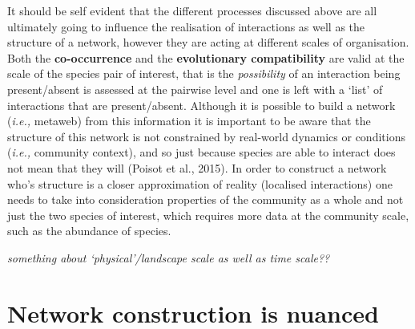 \documentclass[
]{article}
\begin{document}
It should be self evident that the different processes discussed above
are all ultimately going to influence the realisation of interactions as
well as the structure of a network, however they are acting at different
scales of organisation. Both the \textbf{co-occurrence} and the
\textbf{evolutionary compatibility} are valid at the scale of the
species pair of interest, that is the \emph{possibility} of an
interaction being present/absent is assessed at the pairwise level and
one is left with a `list' of interactions that are present/absent.
Although it is possible to build a network (\emph{i.e.,} metaweb) from
this information it is important to be aware that the structure of this
network is not constrained by real-world dynamics or conditions
(\emph{i.e.,} community context), and so just because species are able
to interact does not mean that they will (Poisot et al., 2015). In order
to construct a network who's structure is a closer approximation of
reality (localised interactions) one needs to take into consideration
properties of the community as a whole and not just the two species of
interest, which requires more data at the community scale, such as the
abundance of species.

\emph{something about `physical'/landscape scale as well as time
scale??}

\section{Network construction is
nuanced}\label{network-construction-is-nuanced}
\end{document}
